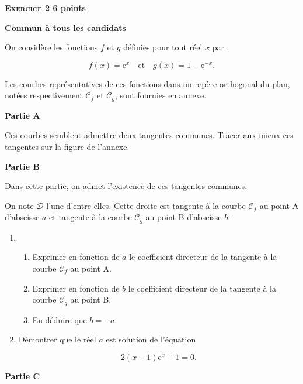 \documentclass[10pt]{article}
\begin{document}
\vspace{0,5cm}

\textbf{\textsc{Exercice 2} \hfill 6 points}

\textbf{Commun  à tous les candidats} 

On considère les fonctions $f$ et $g$ définies pour tout réel $x$ par : 

\[f(x) = \text{e}^x \quad  \text{et}\quad  g(x) = 1 - \text{e}^{- x}.\]
 
Les courbes représentatives de ces fonctions dans un repère orthogonal du plan, notées respectivement $\mathcal{C}_{f}$ et $\mathcal{C}_{g}$, sont fournies en annexe.

\bigskip
 
\textbf{Partie A}

\medskip
  
Ces courbes semblent admettre deux tangentes communes. Tracer aux mieux ces tangentes sur la figure de l'annexe. 

\bigskip
 
\textbf{Partie B}

\medskip 

Dans cette partie, on admet l'existence de ces tangentes communes. 

On note $\mathcal{D}$ l'une d'entre elles. Cette droite est tangente à la courbe $\mathcal{C}_{f}$ au point A d'abscisse $a$ et tangente à la courbe $\mathcal{C}_{g}$ au point B d'abscisse $b$.

\medskip
 
\begin{enumerate}
\item 
	\begin{enumerate}
		\item Exprimer en fonction de $a$ le coefficient directeur de la tangente à la courbe $\mathcal{C}_{f}$ au point A. 
		\item Exprimer en fonction de $b$ le coefficient directeur de la tangente à la courbe $\mathcal{C}_{g}$ au point B. 
		\item En déduire que $b = - a$.
	\end{enumerate} 
\item Démontrer que le réel $a$ est solution de l'équation 

\[2( x - 1)\text{e}^x + 1 = 0.\]

\end{enumerate} 
\bigskip
 
\textbf{Partie C}

\medskip
 
\end{document}
